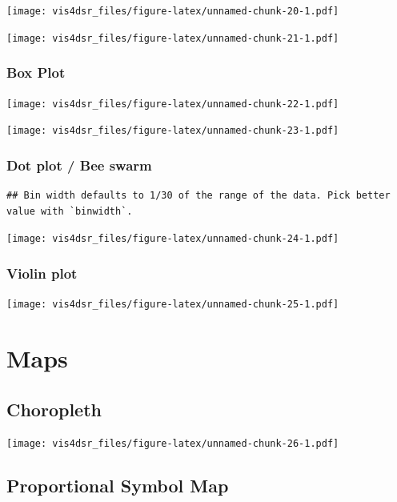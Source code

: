 \documentclass[
]{krantz}
\begin{document}
\texttt{[image: vis4dsr\_files/figure-latex/unnamed-chunk-20-1.pdf]}

\texttt{[image: vis4dsr\_files/figure-latex/unnamed-chunk-21-1.pdf]}

\hypertarget{box-plot}{%
\subsubsection{Box Plot}\label{box-plot}}

\texttt{[image: vis4dsr\_files/figure-latex/unnamed-chunk-22-1.pdf]}

\texttt{[image: vis4dsr\_files/figure-latex/unnamed-chunk-23-1.pdf]}

\hypertarget{dot-plot-bee-swarm}{%
\subsubsection{Dot plot / Bee swarm}\label{dot-plot-bee-swarm}}

\begin{verbatim}
## Bin width defaults to 1/30 of the range of the data. Pick better value with `binwidth`.
\end{verbatim}

\texttt{[image: vis4dsr\_files/figure-latex/unnamed-chunk-24-1.pdf]}

\hypertarget{violin-plot}{%
\subsubsection{Violin plot}\label{violin-plot}}

\texttt{[image: vis4dsr\_files/figure-latex/unnamed-chunk-25-1.pdf]}

\hypertarget{maps}{%
\section{Maps}\label{maps}}

\hypertarget{choropleth}{%
\subsection{Choropleth}\label{choropleth}}

\texttt{[image: vis4dsr\_files/figure-latex/unnamed-chunk-26-1.pdf]}

\hypertarget{proportional-symbol-map}{%
\subsection{Proportional Symbol Map}\label{proportional-symbol-map}}
\end{document}
